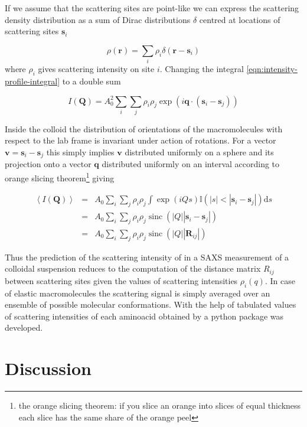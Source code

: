 \documentclass{doctoral}
\newcommand{\dd}{\mathrm{d}}
\newcommand{\code}[1]{\texttt{\detokenize{#1}}}
\begin{document}
If we assume that the scattering sites are point-like we can express the scattering density distribution as a sum of Dirac distributions $\delta$ centred at locations of scattering sites $\mathbf{s}_i$

\begin{equation}
    \rho(\mathbf{r}) = \sum_i \rho_i \delta(\mathbf{r}-\mathbf{s}_i)
\end{equation}
where $\rho_i$ gives scattering intensity on site $i$. Changing the integral \eqref{eqn:intensity-profile-integral} to a double sum

\begin{equation}
    I(\mathbf{Q}) = A_0^2 \sum_i \sum_j \rho_i \rho_j \exp(i \mathbf{q} \cdot (\mathbf{s}_i - \mathbf{s}_j))
\end{equation}

Inside the colloid the distribution of orientations of the macromolecules with respect to the lab frame is invariant under action of rotations. For a vector $\mathbf{v} = \mathbf{s}_i - \mathbf{s}_j$ this simply implies $\mathbf{v}$ distributed uniformly on a sphere and its projection onto a vector $\mathbf{q}$ distributed uniformly on an interval according to orange slicing theorem\footnote{the orange slicing theorem: if you slice an orange into slices of equal thickness each slice has the same share of the orange peel} giving

\begin{eqnarray}
    \left< I(\mathbf{Q}) \right> &=& 
    A_0 \sum_i \sum_j \rho_i \rho_j \int \exp(i Q s) \mathbb{I}(|s| < |\mathbf{s}_i - \mathbf{s}_j|) \dd s\\
    &=& 
    A_0 \sum_i \sum_j \rho_i \rho_j \operatorname{sinc}(|Q||\mathbf{s}_i - \mathbf{s}_j|)\\
    &=& A_0 \sum_i \sum_j \rho_i \rho_j \operatorname{sinc}(|Q||\mathbf{R}_{ij}|)
\end{eqnarray}

Thus the prediction of the scattering intensity of in a SAXS measurement of a colloidal suspension reduces to the computation of the distance matrix $R_{ij}$ between scattering sites given the values of scattering intensities $\rho_i(q)$. 
In case of elastic macromolecules the scattering signal is simply averaged over an ensemble of possible molecular conformations. With the help of tabulated values of scattering intensities of each aminoacid obtained by \textcite{Tong_2016} a python package \code{saxs_single_bead} was developed.

\chapter{Discussion}
\end{document}
